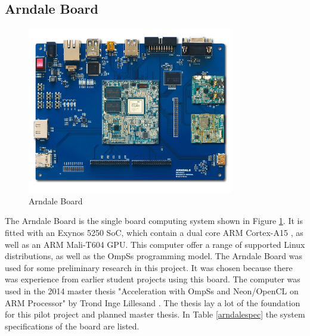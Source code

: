 \subsection{Arndale Board} \label{ArndaleBoard}
\begin{figure}[H]
  \centering
  \includegraphics[width=90mm]{fig/Arendale.jpg}
  \caption{Arndale Board \label{ArndaleBoardImage}}
\end{figure}
The Arndale Board is the single board computing system shown in Figure \ref{ArndaleBoardImage}.
It is fitted with an Exynos 5250 SoC, which contain a dual core ARM Cortex-A15 , as well as an ARM Mali-T604 GPU.
This computer offer a range of supported Linux distributions, as well as the OmpSs programming model.
The Arndale Board was used for some preliminary research in this project.
It was chosen because there was experience from earlier student projects using this board.
The computer was used in the 2014 master thesis "Acceleration with OmpSs and Neon/OpenCL on ARM Processor" by Trond Inge Lillesand \cite{lillesand13}.
The thesis lay a lot of the foundation for this pilot project and planned master thesis.
In Table \ref{arndalespec} the system specifications of the board are listed.

